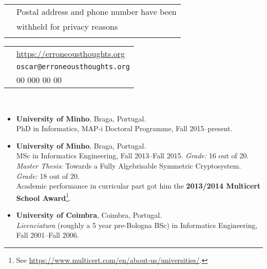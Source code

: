 \documentclass[a4paper,10pt]{extarticle}
\newenvironment{topic}[1]
   {{\noindent\large\bfseries\raisebox{0pt}[\height][1ex]{#1}\hrule\par}%
    \begin{list}{}{%
       \setlength{\leftmargin}{.0cm}}\item[]}
   {\end{list}\medskip}
\newenvironment{header}[1]
   {\raggedleft{\noindent\large\bfseries\raisebox{0pt}[\height][1ex]{%
		 \Large\bfseries Curriculum Vit\ae\ --- #1\par}\hrule}%
		 \begin{center}}
		 {\end{center}\medskip}
\newlength{\leftheaderlength}\setlength{\leftheaderlength}{0.56\textwidth}
\newlength{\rightheaderlength}\setlength{\rightheaderlength}{0.44\textwidth}
\begin{document}
\begin{header}{Óscar Francisco Godinho Pereira} 
	\begin{minipage}[t]{\leftheaderlength}%
		\begin{tabular}{c l}
			\Letter  & Postal address and phone number have been\\
			         & withheld for privacy reasons\\
							 & \phantom{xpto}
		\end{tabular}
	\end{minipage}%
	\begin{minipage}[t]{\rightheaderlength}%
		\begin{tabular}{cl}
			\Keyboard   & \url{https://erroneousthoughts.org}\\
			            & \texttt{oscar@erroneousthoughts.org}\\
			\Mobilefone & 00 000 00 00\\
		\end{tabular}
	\end{minipage}\\[1.5em]
\end{header}

\begin{topic}{Formal Education}
  \begin{itemize}[leftmargin=*]
    \item {\bfseries University of Minho}, Braga, Portugal.\\
      PhD in Informatics, MAP-i Doctoral Programme, Fall 2015--present.
    \item {\bfseries University of Minho}, Braga, Portugal.\\
			MSc in Informatics Engineering, Fall 2013--Fall 2015. \emph{Grade:} 16 out 
			of 20.\\
			\emph{Master Thesis}: Towards a Fully Algebrisable Symmetric Cryptosystem. 
			\emph{Grade:} 18 out of 20.\\
			Academic performance in curricular part got him the \textbf{2013/2014 
			Multicert School Award}\footnote{See 
			\url{https://www.multicert.com/en/about-us/universities/}.}.
    \item {\bfseries University of Coimbra}, Coimbra, Portugal.\\
			\emph{Licenciatura} (roughly a 5 year pre-Bologna BSc) in Informatics 
			Engineering, Fall 2001--Fall 2006.
  \end{itemize}
\end{topic}
\end{document}
